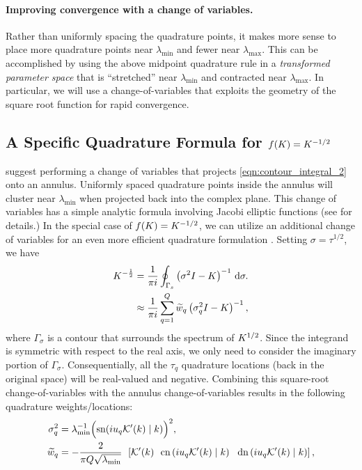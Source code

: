 \paragraph{Improving convergence with a change of variables.}
Rather than uniformly spacing the quadrature points, it makes more sense to place more quadrature points near $\lambda_\text{min}$ and fewer near $\lambda_\text{max}$.
This can be accomplished by using the above midpoint quadrature rule in a \emph{transformed parameter space} that is ``stretched'' near $\lambda_\text{min}$ and contracted near $\lambda_\text{max}$.
In particular, we will use a change-of-variables that exploits the geometry of the square root function for rapid convergence.

\subsection{A Specific Quadrature Formula for $f(K) = K^{-1/2}$}
\citet{hale2008computing} suggest performing a change of variables that projects \cref{eqn:contour_integral_2} onto an annulus.
Uniformly spaced quadrature points inside the annulus will cluster near $\lambda_\text{min}$ when projected back into the complex plane.
This change of variables has a simple analytic formula involving Jacobi elliptic functions (see \citep[][Sec. 2]{hale2008computing} for details.)
In the special case of $f(K) = K^{-1/2}$, we can utilize an additional change of variables for an even more efficient quadrature formulation \citep[][Sec. 4]{hale2008computing}.
Setting $\sigma = \tau^{1/2}$, we have
%
\begin{align}
	K^{-\frac 1 2}
  &= \frac{1}{\pi i} \oint_{\Gamma_s} \left( \sigma^2 I - K \right)^{-1} \,\mathrm{d}{\sigma}.
  \nonumber
  \\
  &\approx
  \frac{1}{\pi i} \sum_{q=1}^Q \widetilde w_q \left( \sigma_q^2 I - K \right)^{-1},
  \label{eqn:contour_integral_quad_3}
\end{align}
%
where $\Gamma_\sigma$ is a contour that surrounds the spectrum of $K^{1/2}$.
Since the integrand is symmetric with respect to the real axis, we only need to consider the imaginary portion of $\Gamma_\sigma$.
Consequentially, all the $\tau_q$ quadrature locations (back in the original space) will be real-valued and negative.
Combining this square-root change-of-variables with the annulus change-of-variables results in the following quadrature weights/locations:
%
\begin{equation}
  \begin{split}
    \sigma_q^2
    &= \lambda_\text{min}^{-1} \Bigl( \text{sn}(i u_q \mathcal{K}'(k) \mid k) \Bigr)^2,
    \\
    \widetilde w_q
    &= -\frac{ 2 }{ \pi Q \sqrt{\lambda_\text{min}} }
    \:\: \left[
    \mathcal{K}'( k )
    \:\:\: \text{cn} \left( i u_q \mathcal{K}'(k) \mid k \right)
    \:\:\: \text{dn} \left( i u_q \mathcal{K}'(k) \mid k \right)
    \right],
  \end{split}
  \label{eqn:quad_points_and_locations}
\end{equation}
